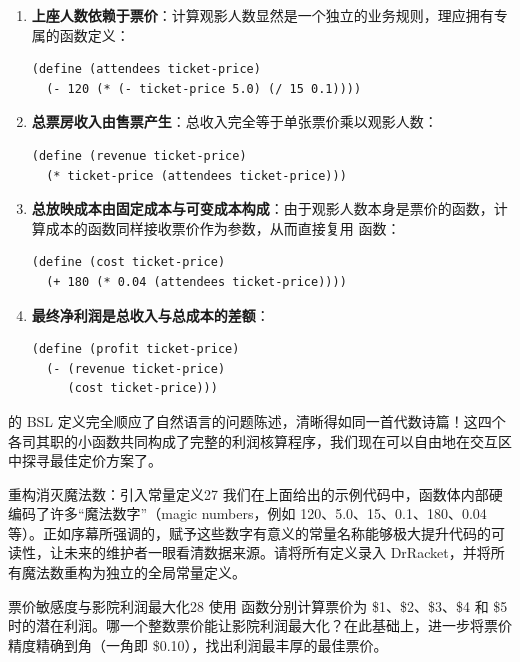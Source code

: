 \begin{enumerate}
  \item \textbf{上座人数依赖于票价}：计算观影人数显然是一个独立的业务规则，理应拥有专属的函数定义：
\begin{lstlisting}[language=BSL]
(define (attendees ticket-price)
  (- 120 (* (- ticket-price 5.0) (/ 15 0.1))))
\end{lstlisting}

  \item \textbf{总票房收入由售票产生}：总收入完全等于单张票价乘以观影人数：
\begin{lstlisting}[language=BSL]
(define (revenue ticket-price)
  (* ticket-price (attendees ticket-price)))
\end{lstlisting}

  \item \textbf{总放映成本由固定成本与可变成本构成}：由于观影人数本身是票价的函数，计算成本的函数同样接收票价作为参数，从而直接复用  函数：
\begin{lstlisting}[language=BSL]
(define (cost ticket-price)
  (+ 180 (* 0.04 (attendees ticket-price))))
\end{lstlisting}

  \item \textbf{最终净利润是总收入与总成本的差额}：
\begin{lstlisting}[language=BSL]
(define (profit ticket-price)
  (- (revenue ticket-price)
     (cost ticket-price)))
\end{lstlisting}
\end{enumerate}

 的 BSL 定义完全顺应了自然语言的问题陈述，清晰得如同一首代数诗篇！这四个各司其职的小函数共同构成了完整的利润核算程序，我们现在可以自由地在交互区中探寻最佳定价方案了。

\begin{exercise}{重构消灭魔法数：引入常量定义}{27}
我们在上面给出的示例代码中，函数体内部硬编码了许多“魔法数字”（magic numbers，例如 120、5.0、15、0.1、180、0.04 等）。正如序幕所强调的，赋予这些数字有意义的常量名称能够极大提升代码的可读性，让未来的维护者一眼看清数据来源。请将所有定义录入 DrRacket，并将所有魔法数重构为独立的全局常量定义。
\end{exercise}

\begin{exercise}{票价敏感度与影院利润最大化}{28}
使用  函数分别计算票价为 \$1、\$2、\$3、\$4 和 \$5 时的潜在利润。哪一个整数票价能让影院利润最大化？在此基础上，进一步将票价精度精确到角（一角即 \$0.10），找出利润最丰厚的最佳票价。
\end{exercise}

